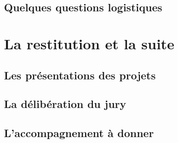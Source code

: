 \documentclass[]{book}
\begin{document}
\section{Quelques questions
logistiques}\label{quelques-questions-logistiques}

\chapter{La restitution et la suite}\label{la-restitution-et-la-suite}

\section{Les présentations des
projets}\label{les-presentations-des-projets}

\section{La délibération du jury}\label{la-deliberation-du-jury}

\section{L'accompagnement à donner}\label{laccompagnement-a-donner}


\end{document}
